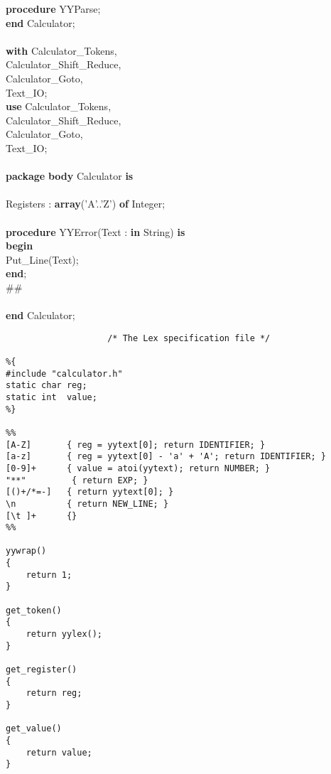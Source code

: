 \begin{tabbing}
\>  {\bf procedure} YYParse;\\
{\bf end} Calculator;\\
\\
{\bf with} Calculator\_Tokens,\\
\>\>     Calculator\_Shift\_Reduce,\\
\>\>     Calculator\_Goto,\\
\>\>     Text\_IO;\\
{\bf use}  Calculator\_Tokens,\\
\>\>     Calculator\_Shift\_Reduce,\\
\>\>     Calculator\_Goto,\\
\>\>     Text\_IO;\\
\\
{\bf package} {\bf body} Calculator {\bf is}\\
\\
\>  Registers : {\bf array}('A'..'Z') {\bf of} Integer;\\
\\
\>  {\bf procedure} YYError(Text : {\bf in} String) {\bf is}\\
\>  {\bf begin}\\
\>\>    Put\_Line(Text);\\
\>  {\bf end};\\
\#\#\\
\\
{\bf end} Calculator;\\
\end{tabbing}
\newpage
\begin{verbatim}
                    /* The Lex specification file */

%{
#include "calculator.h"
static char reg;
static int  value;
%}

%%
[A-Z]       { reg = yytext[0]; return IDENTIFIER; }
[a-z]       { reg = yytext[0] - 'a' + 'A'; return IDENTIFIER; }
[0-9]+      { value = atoi(yytext); return NUMBER; }
"**"         { return EXP; }
[()+/*=-]   { return yytext[0]; }
\n          { return NEW_LINE; }
[\t ]+      {}
%%

yywrap()
{
    return 1;
}

get_token()
{
    return yylex();
}

get_register()
{
    return reg;
}

get_value()
{
    return value;
}
\end{verbatim}
\newpage
